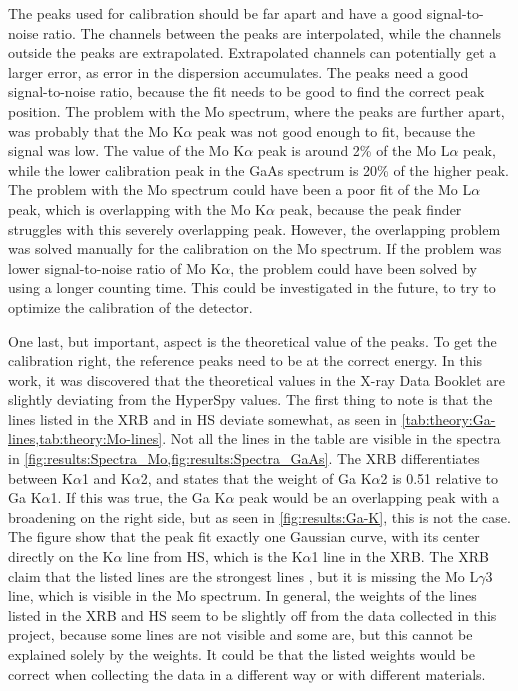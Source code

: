 The peaks used for calibration should be far apart and have a good signal-to-noise ratio.
The channels between the peaks are interpolated, while the channels outside the peaks are extrapolated.
Extrapolated channels can potentially get a larger error, as error in the dispersion accumulates.
The peaks need a good signal-to-noise ratio, because the fit needs to be good to find the correct peak position.
The problem with the Mo spectrum, where the peaks are further apart, was probably that the Mo K$\alpha$ peak was not good enough to fit, because the signal was low.
The value of the Mo K$\alpha$ peak is around 2\% of the Mo L$\alpha$ peak, while the lower calibration peak in the GaAs spectrum is 20\% of the higher peak.
The problem with the Mo spectrum could have been a poor fit of the Mo L$\alpha$ peak, which is overlapping with the Mo K$\alpha$ peak, because the peak finder struggles with this severely overlapping peak.
However, the overlapping problem was solved manually for the calibration on the Mo spectrum.
If the problem was lower signal-to-noise ratio of Mo K$\alpha$, the problem could have been solved by using a longer counting time.
This could be investigated in the future, to try to optimize the calibration of the detector.


One last, but important, aspect is the theoretical value of the peaks.
To get the calibration right, the reference peaks need to be at the correct energy.
In this work, it was discovered that the theoretical values in the X-ray Data Booklet are slightly deviating from the HyperSpy values.
The first thing to note is that the lines listed in the XRB and in HS deviate somewhat, as seen in \cref{tab:theory:Ga-lines,tab:theory:Mo-lines}.
Not all the lines in the table are visible in the spectra in \cref{fig:results:Spectra_Mo,fig:results:Spectra_GaAs}.
The XRB differentiates between K$\alpha$1 and K$\alpha$2, and states that the weight of Ga K$\alpha$2 is 0.51 relative to Ga K$\alpha$1.
If this was true, the Ga K$\alpha$ peak would be an overlapping peak with a broadening on the right side, but as seen in \cref{fig:results:Ga-K}, this is not the case.
The figure show that the peak fit exactly one Gaussian curve, with its center directly on the K$\alpha$ line from HS, which is the K$\alpha$1 line in the XRB.
The XRB claim that the listed lines are the strongest lines \cite[P. 33, Sec. 1.2]{thompson_x-ray_2004}, but it is missing the Mo L$\gamma$3 line, which is visible in the Mo spectrum.
In general, the weights of the lines listed in the XRB and HS seem to be slightly off from the data collected in this project, because some lines are not visible and some are, but this cannot be explained solely by the weights.
It could be that the listed weights would be correct when collecting the data in a different way or with different materials.



